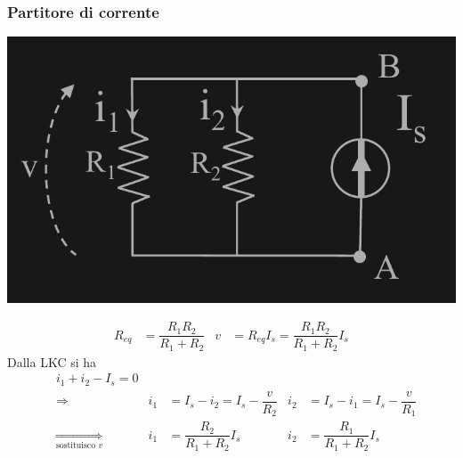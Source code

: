 \documentclass{article}
\begin{document}
\subsubsection{Partitore di corrente}
\begin{center}
    \includegraphics[scale=0.23]{Image/Partitore di corrente.png}
\end{center}
\begin{align*}
    R_{eq} &= \dfrac{R_1R_2}{R_1+R_2} & v &= R_{eq}I_s = \dfrac{R_1R_2}{R_1+R_2}I_s
\end{align*}
Dalla LKC si ha
\begin{align*}
    &i_1 + i_2 -I_s = 0\\
    &\Longrightarrow & i_1 &= I_s - i_2 = I_s - \dfrac{v}{R_2} &  i_2 &= I_s - i_1 = I_s - \dfrac{v}{R_1}\\
    &\underset{\text{sostituisco } v}{\Longrightarrow} & i_1 &= \dfrac{R_2}{R_1+R_2}I_s &  i_2 &= \dfrac{R_1}{R_1+R_2}I_s
\end{align*}
\end{document}
